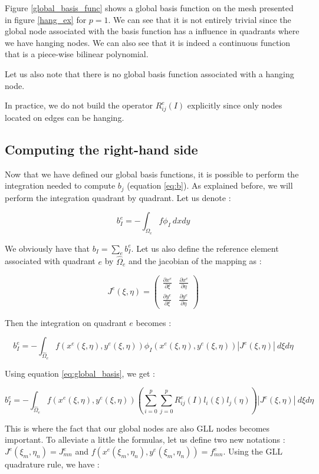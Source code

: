 Figure \ref{global_basis_func} shows a global basis function on the mesh presented in figure \ref{hang_ex} for $p=1$. We can see that it is not entirely trivial since the global node associated with the basis function has a influence in quadrants where we have hanging nodes. We can also see that it is indeed a continuous function that is a piece-wise bilinear polynomial. 

Let us also note that there is no global basis function associated with a hanging node. 

In practice, we do not build the operator $R^e_{ij}(I)$ explicitly since only nodes located on edges can be hanging. 

\subsection{Computing the right-hand side}

Now that we have defined our global basis functions, it is possible to perform the integration needed to compute $b_j$ (equation \ref{eq:b}). As explained before, we will perform the integration quadrant by quadrant. Let us denote : 

$$ b_I^e = -\int_{\Omega_e} f\phi_I\:dxdy$$

We obviously have that $b_I = \sum_e b_I^e$. Let us also define the reference element associated with quadrant $e$ by $\hat{\Omega}_e$ and the jacobian of the mapping as : 

$$ J^e (\xi,\eta) = \begin{pmatrix}
\frac{\partial x^e}{\partial \xi} & \frac{\partial x^e}{\partial \eta}\\
\frac{\partial y^e}{\partial \xi} & \frac{\partial y^e}{\partial \eta}
\end{pmatrix}$$

Then the integration on quadrant $e$ becomes : 

$$b_I^e = -\int_{\hat{\Omega}_e} f(x^e(\xi,\eta),y^e(\xi,\eta)) \phi_I(x^e(\xi,\eta),y^e(\xi,\eta)) |J^e(\xi,\eta)| \: d\xi d\eta$$

Using equation \ref{eq:global_basis}, we get : 

$$b_I^e = -\int_{\hat{\Omega}_e} f(x^e(\xi,\eta),y^e(\xi,\eta)) \left( \sum_{i=0}^p\sum_{j=0}^p R^e_{ij}(I) l_i(\xi)l_j(\eta) \right) |J^e(\xi,\eta)| \: d\xi d\eta $$

This is where the fact that our global nodes are also GLL nodes becomes important. To alleviate a little the formulas, let us define two new notations :  $J^e(\xi_m,\eta_n) = J^e_{mn}$ and $f(x^e(\xi_m,\eta_n),y^e(\xi_m,\eta_n)) = f^e_{mn}$. Using the GLL quadrature rule, we have : 

